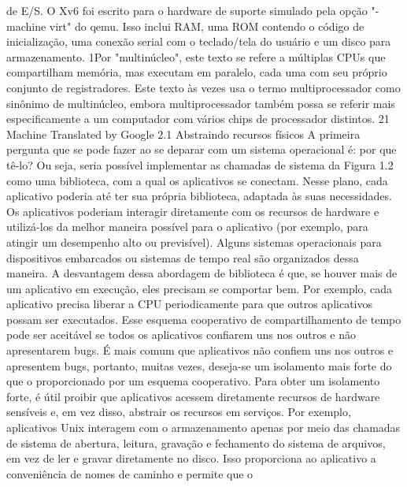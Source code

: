 de  E/S.  O  Xv6  foi  escrito  para  o  hardware  de  suporte  simulado  pela  opção  "-machine  virt"  do  qemu.  Isso  inclui  RAM,  
uma  ROM  contendo  o  código  de  inicialização,  uma  conexão  serial  com  o  teclado/tela  do  usuário  e  um  disco  para  
armazenamento.
 1Por  "multinúcleo",  este  texto  se  refere  a  múltiplas  CPUs  que  compartilham  memória,  mas  executam  em  paralelo,  cada  uma  com  seu  próprio  
conjunto  de  registradores.  Este  texto  às  vezes  usa  o  termo  multiprocessador  como  sinônimo  de  multinúcleo,  embora  multiprocessador  também  
possa  se  referir  mais  especificamente  a  um  computador  com  vários  chips  de  processador  distintos.
 21
Machine Translated by Google
 2.1  Abstraindo  recursos  físicos
 A  primeira  pergunta  que  se  pode  fazer  ao  se  deparar  com  um  sistema  operacional  é:  por  que  tê-lo?  Ou  seja,  seria  possível  
implementar  as  chamadas  de  sistema  da  Figura  1.2  como  uma  biblioteca,  com  a  qual  os  aplicativos  se  conectam.  Nesse  plano,  
cada  aplicativo  poderia  até  ter  sua  própria  biblioteca,  adaptada  às  suas  necessidades.  Os  aplicativos  poderiam  interagir  
diretamente  com  os  recursos  de  hardware  e  utilizá-los  da  melhor  maneira  possível  para  o  aplicativo  (por  exemplo,  para  atingir  um  
desempenho  alto  ou  previsível).  Alguns  sistemas  operacionais  para  dispositivos  embarcados  ou  sistemas  de  tempo  real  são  
organizados  dessa  maneira.
 A  desvantagem  dessa  abordagem  de  biblioteca  é  que,  se  houver  mais  de  um  aplicativo  em  execução,  eles  precisam  se  
comportar  bem.  Por  exemplo,  cada  aplicativo  precisa  liberar  a  CPU  periodicamente  para  que  outros  aplicativos  possam  ser  
executados.  Esse  esquema  cooperativo  de  compartilhamento  de  tempo  pode  ser  aceitável  se  todos  os  aplicativos  confiarem  uns  
nos  outros  e  não  apresentarem  bugs.  É  mais  comum  que  aplicativos  não  confiem  uns  nos  outros  e  apresentem  bugs,  portanto,  
muitas  vezes,  deseja-se  um  isolamento  mais  forte  do  que  o  proporcionado  por  um  esquema  cooperativo.
 Para  obter  um  isolamento  forte,  é  útil  proibir  que  aplicativos  acessem  diretamente  recursos  de  hardware  sensíveis  e,  
em  vez  disso,  abstrair  os  recursos  em  serviços.  Por  exemplo,  aplicativos  Unix  interagem  com  o  armazenamento  apenas  
por  meio  das  chamadas  de  sistema  de  abertura,  leitura,  gravação  e  fechamento  do  sistema  de  arquivos,  em  vez  de  ler  e  
gravar  diretamente  no  disco.  Isso  proporciona  ao  aplicativo  a  conveniência  de  nomes  de  caminho  e  permite  que  o  
